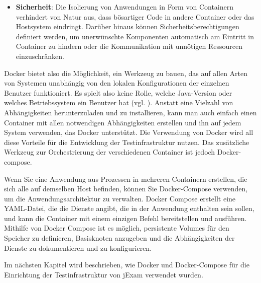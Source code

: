 \begin{itemize}
    \item[] \textbf{Sicherheit}: Die Isolierung von Anwendungen in Form von
    Containern verhindert von Natur aus, dass bösartiger Code in
    andere Container oder das Hostsystem eindringt. Darüber hinaus
    können Sicherheitsberechtigungen definiert werden, um unerwünschte
    Komponenten automatisch am Eintritt in Container zu hindern oder
    die Kommunikation mit unnötigen Ressourcen einzuschränken.

\end{itemize}


Docker bietet also die Möglichkeit, ein Werkzeug zu bauen, das auf
allen Arten von Systemen unabhängig von den lokalen Konfigurationen
der einzelnen Benutzer funktioniert. Es spielt also keine Rolle,
welche Java-Version oder welches Betriebssystem ein Benutzer hat (vgl. \cite{ibm-docker}).
Anstatt eine Vielzahl von Abhängigkeiten herunterzuladen und zu
installieren, kann man auch einfach einen Container mit allen
notwendigen Abhängigkeiten erstellen und ihn auf jedem System
verwenden, das Docker unterstützt. Die Verwendung von Docker wird all diese Vorteile für die Entwicklung
der Testinfrastruktur nutzen. Das zusätzliche Werkzeug zur
Orchestrierung der verschiedenen Container ist jedoch Docker-compose.


Wenn Sie eine Anwendung aus Prozessen in mehreren Containern erstellen,
die sich alle auf demselben Host befinden, können Sie Docker-Compose
verwenden, um die Anwendungsarchitektur zu verwalten. Docker Compose
erstellt eine YAML-Datei, die die Dienste angibt, die in der Anwendung
enthalten sein sollen, und kann die Container mit einem einzigen
Befehl bereitstellen und ausführen. Mithilfe von Docker Compose ist
es möglich, persistente Volumes für den Speicher zu definieren,
Basisknoten anzugeben und die Abhängigkeiten der Dienste zu
dokumentieren und zu konfigurieren.


Im nächsten Kapitel wird beschrieben, wie Docker und Docker-Compose
für die Einrichtung der Testinfrastruktur von jExam verwendet
wurden.


